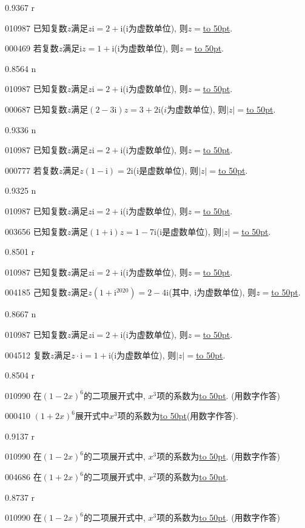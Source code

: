 \documentclass[10pt,a4paper]{article}
\newcommand{\blank}[1]{\underline{\hbox to #1pt{}}}
\begin{document}
0.9367 r

010987	已知复数$z$满足$z\mathrm{i}=2+\mathrm{i}$($\mathrm{i}$为虚数单位), 则$z=$\blank{50}.

000469	若复数$z$满足$\mathrm{i}z=1+\mathrm{i}$($\mathrm{i}$为虚数单位), 则$z=$\blank{50}.

0.8564 n

010987	已知复数$z$满足$z\mathrm{i}=2+\mathrm{i}$($\mathrm{i}$为虚数单位), 则$z=$\blank{50}.

000687	已知复数$z$满足$(2-3\mathrm{i})z=3+2\mathrm{i}$($i$为虚数单位), 则$|z|=$\blank{50}.

0.9336 n

010987	已知复数$z$满足$z\mathrm{i}=2+\mathrm{i}$($\mathrm{i}$为虚数单位), 则$z=$\blank{50}.

000777	若复数$z$满足$z(1-\mathrm{i})=2 \mathrm{i}$($\mathrm{i}$是虚数单位), 则$|z|=$\blank{50}.

0.9325 n

010987	已知复数$z$满足$z\mathrm{i}=2+\mathrm{i}$($\mathrm{i}$为虚数单位), 则$z=$\blank{50}.

003656	已知复数$z$满足$(1+\mathrm{i})z=1-7\mathrm{i}$($\mathrm{i}$是虚数单位), 则$|z|=$\blank{50}.

0.8501 r

010987	已知复数$z$满足$z\mathrm{i}=2+\mathrm{i}$($\mathrm{i}$为虚数单位), 则$z=$\blank{50}.

004185	己知复数$z$满足$z(1+\mathrm{i}^{2020})=2-4\mathrm{i}$(其中, $\mathrm{i}$为虚数单位), 则$z=$\blank{50}.

0.8667 n

010987	已知复数$z$满足$z\mathrm{i}=2+\mathrm{i}$($\mathrm{i}$为虚数单位), 则$z=$\blank{50}.

004512	复数$z$满足$z\cdot \mathrm{i}=1+\mathrm{i}$($\mathrm{i}$为虚数单位), 则$|z|=$\blank{50}.

0.8504 r

010990	在$(1-2x)^6$的二项展开式中, $x^3$项的系数为\blank{50}. (用数字作答)

000410	$(1+2x)^6$展开式中$x^3$项的系数为\blank{50}(用数字作答).

0.9137 r

010990	在$(1-2x)^6$的二项展开式中, $x^3$项的系数为\blank{50}. (用数字作答)

004686	在$(1+2x)^6$的二项展开式中, $x^2$项的系数为\blank{50}.

0.8737 r

010990	在$(1-2x)^6$的二项展开式中, $x^3$项的系数为\blank{50}. (用数字作答)
\end{document}
